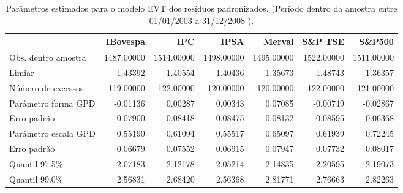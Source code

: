 \begin{table}[H]
\centering
\caption{Parâmetros estimados para o modelo EVT dos resíduos padronizados. 
               (Período dentro da amostra entre 01/01/2003 a 31/12/2008 ).} 
\label{tab:evtcoef}
\begin{tabular}{lrrrrrr}
  \hline
 & IBovespa & IPC & IPSA & Merval & S\&P TSE & S\&P500 \\ 
  \hline
Obs. dentro amostra & 1487.00000 & 1514.00000 & 1498.00000 & 1495.00000 & 1522.00000 & 1511.00000 \\ 
  Limiar & 1.43392 & 1.40554 & 1.40436 & 1.35673 & 1.48743 & 1.36357 \\ 
  Número de excessos & 119.00000 & 122.00000 & 120.00000 & 120.00000 & 122.00000 & 121.00000 \\ 
  Parâmetro forma GPD & -0.01136 & 0.00287 & 0.00343 & 0.07085 & -0.00749 & -0.02867 \\ 
  Erro padrão & 0.07900 & 0.08418 & 0.08475 & 0.08132 & 0.08595 & 0.06368 \\ 
  Parâmetro escala GPD & 0.55190 & 0.61094 & 0.55517 & 0.65097 & 0.61939 & 0.72245 \\ 
  Erro padrão & 0.06679 & 0.07552 & 0.06915 & 0.07947 & 0.07732 & 0.08017 \\ 
  Quantil 97.5\% & 2.07183 & 2.12178 & 2.05214 & 2.14835 & 2.20595 & 2.19073 \\ 
  Quantil 99.0\% & 2.56831 & 2.68420 & 2.56368 & 2.81771 & 2.76663 & 2.82263 \\ 
   \hline
\end{tabular}
\end{table}
